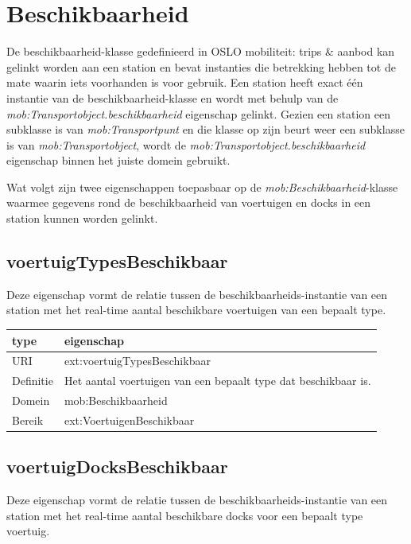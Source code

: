 \section{Beschikbaarheid}
De beschikbaarheid-klasse gedefinieerd in OSLO mobiliteit: trips \& aanbod kan gelinkt worden aan een station en bevat instanties die betrekking hebben tot de mate waarin iets voorhanden is voor gebruik. Een station heeft exact één instantie van de beschikbaarheid-klasse en wordt met behulp van de \textit{mob:Transportobject.beschikbaarheid} eigenschap gelinkt. Gezien een station een subklasse is van \textit{mob:Transportpunt} en die klasse op zijn beurt weer een subklasse is van \textit{mob:Transportobject}, wordt de \textit{mob:Transportobject.beschikbaarheid} eigenschap binnen het juiste domein gebruikt.

Wat volgt zijn twee eigenschappen toepasbaar op de \textit{mob:Beschikbaarheid}-klasse waarmee gegevens rond de beschikbaarheid van voertuigen en docks in een station kunnen worden gelinkt.

\subsection{voertuigTypesBeschikbaar}
Deze eigenschap vormt de relatie tussen de beschikbaarheids-instantie van een station met het real-time aantal beschikbare voertuigen van een bepaalt type.

\begin{table}[h]
\centering
\begin{tabular}{|l|l|}
\hline
\textbf{type}     & \textbf{eigenschap} \\ \hline
URI               & ext:voertuigTypesBeschikbaar \\ \hline
Definitie         & Het aantal voertuigen van een bepaalt type dat beschikbaar is.                                   \\ \hline
Domein & mob:Beschikbaarheid \\ \hline
Bereik & ext:VoertuigenBeschikbaar \\ \hline
\end{tabular}
\end{table}

\subsection{voertuigDocksBeschikbaar}
Deze eigenschap vormt de relatie tussen de beschikbaarheids-instantie van een station met het real-time aantal beschikbare docks voor een bepaalt type voertuig. 

